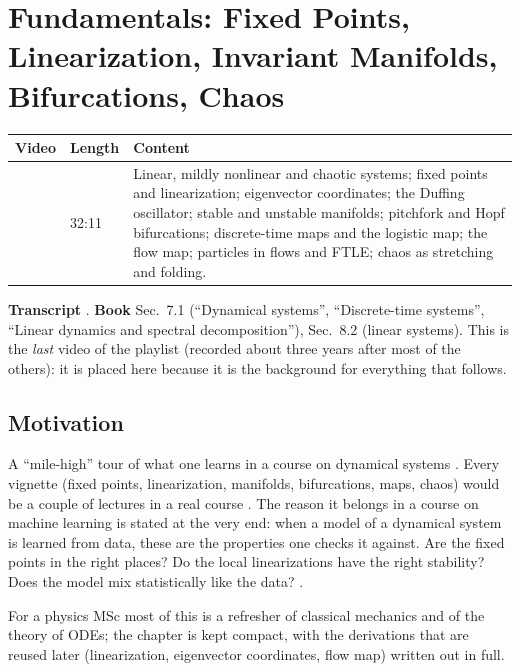 \chapter{Fundamentals: Fixed Points, Linearization, Invariant Manifolds, Bifurcations, Chaos}\label{ch:fundamentals}
\begin{paracol}{2}

\begin{sources}
\begin{tabularx}{\linewidth}{@{}V l L@{}}
\toprule
\textbf{Video} & \textbf{Length} & \textbf{Content}\\
\midrule
{} & 32:11 & Linear, mildly nonlinear and chaotic systems; fixed points and linearization; eigenvector coordinates; the Duffing oscillator; stable and unstable manifolds; pitchfork and Hopf bifurcations; discrete-time maps and the logistic map; the flow map; particles in flows and FTLE; chaos as stretching and folding.\\
\bottomrule
\end{tabularx}

\smallskip
\textbf{Transcript} .
\textbf{Book} Sec.~7.1 (``Dynamical systems'', ``Discrete-time systems'', ``Linear dynamics and
spectral decomposition''), Sec.~8.2 (linear systems).
This is the \emph{last} video of the playlist (recorded about three years after most of the others):
it is placed here because it is the background for everything that follows.
\end{sources}

\section*{Motivation}
A ``mile-high'' tour of what one learns in a course on dynamical systems . Every
vignette (fixed points, linearization, manifolds, bifurcations, maps, chaos) would be a couple of
lectures in a real course . The reason it belongs in a course on machine learning is
stated at the very end: when a model of a dynamical system is learned from data, these are the
properties one checks it against. Are the fixed points in the right places? Do the local linearizations
have the right stability? Does the model mix statistically like the data? .

For a physics MSc most of this is a refresher of classical mechanics and of the theory of ODEs; the
chapter is kept compact, with the derivations that are reused later (linearization, eigenvector
coordinates, flow map) written out in full.


\end{paracol}
